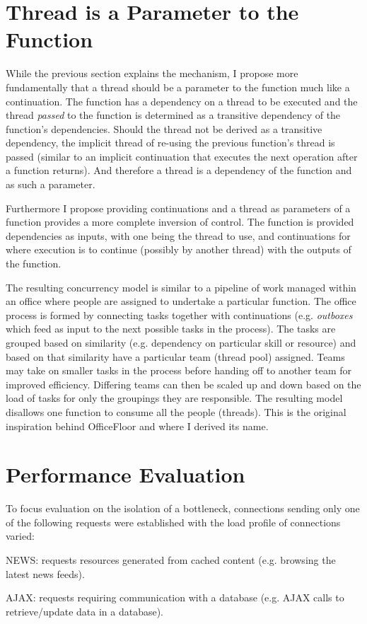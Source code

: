 \documentclass[conference]{ieee/IEEEtran}
\begin{document}
\section{Thread is a Parameter to the Function}
While the previous section explains the mechanism, I propose more fundamentally
that a thread should be a parameter to the function much like a continuation.
The function has a dependency on a thread to be executed and the thread
\textit{passed} to the function is determined as a transitive dependency of the
function's dependencies.  Should the thread not be derived as a transitive
dependency, the implicit thread of re-using the previous function's thread is
passed (similar to an implicit continuation that executes the next operation
after a function returns).  And therefore a thread is a dependency of the
function and as such a parameter.

Furthermore I propose providing continuations and a thread as parameters of a
function provides a more complete inversion of control.  The function is
provided dependencies as inputs, with one being the thread to use, and
continuations for where execution is to continue (possibly by another thread)
with the outputs of the function.

The resulting concurrency model is similar to a pipeline of work managed within
an office where people are assigned to undertake a particular function.
The office process is formed by connecting tasks together with continuations
(e.g. \textit{outboxes} which feed as input to the next possible tasks in the
process).  The tasks are grouped based on similarity (e.g. dependency on
particular skill or resource) and based on that similarity have a particular
team (thread pool) assigned.  Teams may take on smaller tasks in the process
before handing off to another team for improved efficiency.  Differing teams can
then be scaled up and down based on the load of tasks for only the groupings
they are responsible.  The resulting model disallows one function to consume all
the people (threads).  This is the original inspiration behind OfficeFloor and
where I derived its name.



\section{Performance Evaluation}
To focus evaluation on the isolation of a bottleneck, connections sending only
one of the following requests were established with the load profile of
connections varied:
\begin{IEEEitemize}
\item NEWS: requests resources generated from cached content (e.g. browsing the
latest news feeds).
\item AJAX: requests requiring communication with a database (e.g. AJAX calls to
retrieve/update data in a database).
\end{IEEEitemize}
\end{document}
